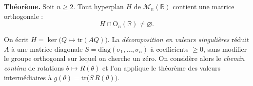 \decsep{}


\begin{tcolorbox}[thmbox]
  \textbf{Théorème.}\enspace%
  Soit $n \geq 2$. Tout hyperplan $H$ de $\mathcal{M}_n(\mathbb{R})$ contient
  une matrice orthogonale :
  \[
    H \cap \mathrm{O}_n(\mathbb{R}) \neq \varnothing.
  \]
\end{tcolorbox}

On écrit $H = \ker\bigl(Q\mapsto\mathrm{tr}(AQ)\bigr)$. La
\emph{décomposition en valeurs singulières}
réduit $A$ à une matrice diagonale $S = \mathrm{diag}(\sigma_1,\ldots,\sigma_n)$
à coefficients $\geq 0$, sans modifier le groupe orthogonal sur lequel on
cherche un zéro. On considère alors le \emph{chemin continu} de rotations $\theta \mapsto R(\theta)$
et l'on applique le théorème des valeurs intermédiaires à
$g(\theta) = \mathrm{tr}\bigl(S\,R(\theta)\bigr)$.

